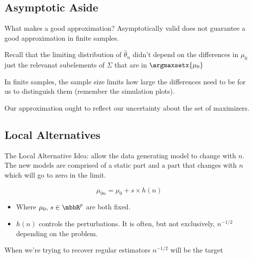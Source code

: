 \documentclass[aspectratio=169, professionalfonts]{beamer}
\begin{document}




\subsection{Asymptotic Aside}

\begin{frame}{What makes a good approximation?}
	Asymptotically valid does not guarantee a good approximation in finite
	samples.

	\vfill


	Recall that the limiting distribution of $\widehat{\theta}_n$ didn't depend on
	the differences in $\mu_0$ just the relevanat subelements of $\Sigma$ that are in $\argmaxsetx{\mu_0}$


	\vfill
	In finite samples, the sample size limits how large the differences
	need to be for us to distinguish them (remember the simulation plots).

	\vfill

	Our approximation ought to reflect our uncertainty about the set
	of 	maximizers.

\end{frame}

\subsection{Local Alternatives}
\begin{frame}{The Local Alternative}
	Idea: allow the data generating model to change with $n$. The new models are
	comprised of a static part and a part that changes with $n$ which
	will go to zero in the limit.

	$$\mu_{0n} = \mu_0 + s \times h(n)$$
	\begin{itemize}
		\item Where $\mu_0, \,s \in \mbbR^{p}$ are both fixed.
		      \vfill
		\item $h(n)$ controls the perturbations. It is often, but not
		      exclusively, $n^{-1/2}$ depending on the problem.
	\end{itemize}
	\vfill

	When we're trying to recover regular estimators $n^{-1/2}$ will be the target

\end{frame}
\end{document}
